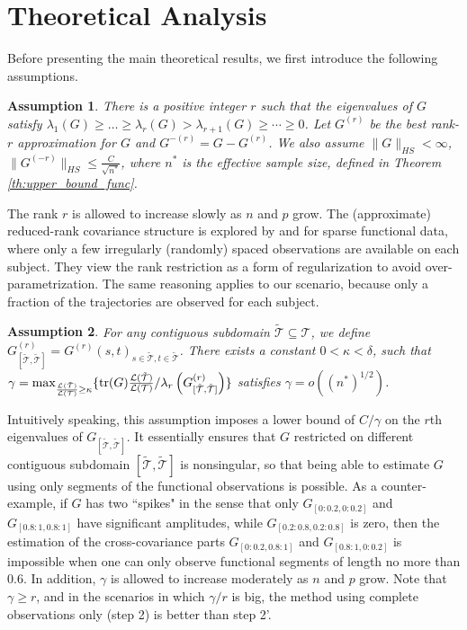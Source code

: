 \documentclass[11pt]{article}
\newtheorem{Assumption}{Assumption}
\newcommand{\cT}{\mathcal{T}}
\newcommand{\0}{{\mathbf{0}}}
\newcommand{\1}{{\mathbf{1}}}
\newcommand{\tr}{{\rm tr}}
\begin{document}
\section{Theoretical Analysis}\label{sec:theory}

Before presenting the main theoretical results, we first introduce the following assumptions.


\begin{Assumption}\label{as:lowrank} 
	There is a positive integer $r$ such that the eigenvalues of $G$ satisfy $ \lambda_1(G) \geq \dots \geq \lambda_r(G) > \lambda_{r+1}(G) \geq \cdots \geq 0$. Let $G^{(r)}$ be the best rank-$r$ approximation for $G$ and $G^{-(r)} = G - G^{(r)}$. We also assume $\|G\|_{HS} < \infty$, $\|G^{(-r)}\|_{HS} \leq \frac{C}{\sqrt{n^\ast}}$, where $n^\ast$ is the effective sample size, defined in Theorem \ref{th:upper_bound_func}. 
\end{Assumption}

The rank $r$ is allowed to increase slowly as $n$ and $p$ grow. The (approximate) reduced-rank covariance structure is explored by \cite{james2000principal} and \cite{peng2009geometric} for sparse functional data, where only a few irregularly (randomly) spaced observations are available on each subject. They view the rank restriction as a form of regularization to avoid over-parametrization. The same reasoning applies to our scenario, because only a fraction of the trajectories are observed for each subject.



\begin{Assumption}\label{as:sub-matrix}
	For any contiguous subdomain $\mathcal{\tilde T}\subseteq \mathcal{T}$, we define $G^{(r)}_{[\tilde{\mathcal{T}}, \tilde{\mathcal{T}}]} = G^{(r)}(s,t)_{s\in  \mathcal{\tilde T}, t\in  \mathcal{\tilde T}}$. There exists a constant $0< \kappa < \delta$, such that \\$\gamma = \max_{\frac{\mathcal{L}(\mathcal{\tilde T})}{\mathcal{L}(\mathcal{T})}\geq \kappa}\{\tr(G)\frac{\mathcal{L}(\mathcal{\tilde T})}{\mathcal{L}(\mathcal{T})}/\lambda_r\left(G^{(r)}_{[\tilde{\mathcal{T}}, \tilde{\mathcal{T}}]}\right)\}$ satisfies $\gamma = o((n^{*})^{1/2})$.
\end{Assumption}
Intuitively speaking, this assumption imposes a lower bound of $C/\gamma$ on the $r$th eigenvalues of $G_{[\tilde{\cT}, \tilde{\cT}]}$. It essentially ensures that $G$ restricted on different contiguous subdomain $[\tilde{\cT}, \tilde{\cT}]$ is nonsingular, so that being able to estimate $G$ using only segments of the functional observations is possible. As a counter-example, if $G$ has two ``spikes" in the sense that only $G_{[0:0.2, 0:0.2]}$ and $G_{[0.8:1, 0.8:1]}$ have significant amplitudes, while $G_{[0.2:0.8, 0.2:0.8]}$ is zero, then the estimation of the cross-covariance parts $G_{[0:0.2, 0.8:1]}$ and $G_{[0.8:1, 0:0.2]}$ is impossible when one can only observe functional segments of length no more than $0.6$.  In addition, $\gamma$ is allowed to increase moderately as $n$ and $p$ grow. Note that $\gamma \geq r$, and in the scenarios in which $\gamma/r$ is big, the method using complete observations only (step 2) is better than step 2'. 
\end{document}
